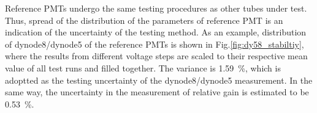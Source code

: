 \documentclass[5p, times]{elsarticle}
\begin{document}
Reference PMTs undergo the same testing procedures as other tubes under test.
Thus, spread of the distribution of the parameters of reference PMT is an indication of the uncertainty of the testing method.
As an example, distribution of dynode8/dynode5 of the reference PMTs is shown in Fig.\ref{fig:dy58_stabiltiy}, where the results from different voltage steps are scaled to their respective mean value of all test runs and filled together.
The variance is \SI{1.59}{\percent}, which is adoptted as the testing uncertainty of the dynode8/dynode5 measurement.
In the same way, the uncertainty in the measurement of relative gain is estimated to be \SI{0.53}{\percent}. 

\end{document}
